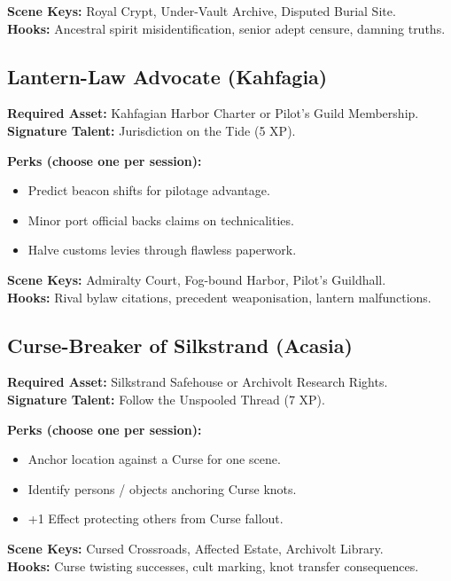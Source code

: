 \textbf{Scene Keys:} Royal Crypt, Under-Vault Archive, Disputed Burial Site.\\
\textbf{Hooks:} Ancestral spirit misidentification, senior adept censure, damning truths.

\subsection{Lantern-Law Advocate (Kahfagia)}\label{subsec:lantern_advocate}

\textbf{Required Asset:} Kahfagian Harbor Charter or Pilot's Guild Membership.\\
\textbf{Signature Talent:} Jurisdiction on the Tide (5 XP).

\textbf{Perks (choose one per session):}
\begin{itemize}
    \item Predict beacon shifts for pilotage advantage.
    \item Minor port official backs claims on technicalities.
    \item Halve customs levies through flawless paperwork.
\end{itemize}

\textbf{Scene Keys:} Admiralty Court, Fog-bound Harbor, Pilot's Guildhall.\\
\textbf{Hooks:} Rival bylaw citations, precedent weaponisation, lantern malfunctions.

\subsection{Curse-Breaker of Silkstrand (Acasia)}\label{subsec:curse_breaker}

\textbf{Required Asset:} Silkstrand Safehouse or Archivolt Research Rights.\\
\textbf{Signature Talent:} Follow the Unspooled Thread (7 XP).

\textbf{Perks (choose one per session):}
\begin{itemize}
    \item Anchor location against a Curse for one scene.
    \item Identify persons / objects anchoring Curse knots.
    \item +1 Effect protecting others from Curse fallout.
\end{itemize}

\textbf{Scene Keys:} Cursed Crossroads, Affected Estate, Archivolt Library.\\
\textbf{Hooks:} Curse twisting successes, cult marking, knot transfer consequences.

